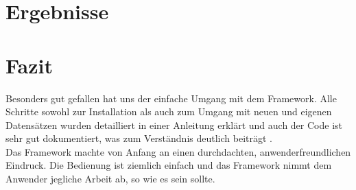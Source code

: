 \section{Ergebnisse}


\section{Fazit}
Besonders gut gefallen hat uns der einfache Umgang mit dem Framework. Alle Schritte sowohl zur Installation als auch zum Umgang mit neuen und eigenen Datensätzen wurden detailliert in einer Anleitung erklärt und auch der Code ist sehr gut dokumentiert, was zum Verständnis deutlich beiträgt \cite{nnunetGithub}.\\
Das Framework machte von Anfang an einen durchdachten, anwenderfreundlichen Eindruck. Die Bedienung ist ziemlich einfach und das Framework nimmt dem Anwender jegliche Arbeit ab, so wie es sein sollte.
